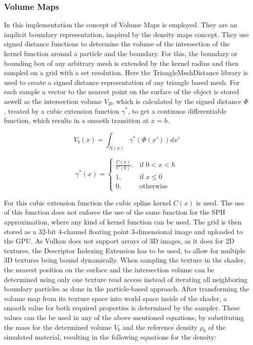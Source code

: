 \documentclass[intern]{cgMA}
\begin{document}
    \subsubsection*{Volume Maps}
    In this implementation the concept of Volume Maps is employed. They are an implicit boundary representation, inspired by the density maps concept. They use signed distance functions to determine the volume of the intersection of the kernel function around a particle and the boundary. For this, the boundary or bounding box of any arbitrary mesh is extended by the kernel radius and then sampled on a grid with a set resolution. Here the TriangleMeshDistance library \cite{trianglemeshdistance} is used to create a signed distance representation of any triangle based mesh. For each sample a vector to the nearest point on the surface of the object is stored aswell as the intersection volume $V_B$, which is calculated by the signed distance $\Phi$, treated by a cubic extension function $\gamma^*$, to get a continuos differentiable function, which results in a smooth transition at $x = h$. \cite{10.1145/3359566.3360077}

    \begin{equation}
        V_b(x) = \int_{N(x)}\gamma^*(\Phi(x'))dx'
    \end{equation}

    \begin{equation}
        \gamma^*(x) = 
        \begin{cases}
            \frac{C(x)}{C(0)},& \text{if } 0 < x < h \\
            1,& \text{if } x \leq 0 \\
            0,              & \text{otherwise}
        \end{cases}
    \end{equation}

    For this cubic extension function the cubic spline kernel $C(x)$ \cite{doi:10.1146/annurev.aa.30.090192.002551} is used. The use of this function does not enforce the use of the same function for the SPH approximation, where any kind of kernel function can be used. \cite{10.1145/3359566.3360077}
    The grid is then stored as a 32-bit 4-channel floating point 3-dimensional image and uploaded to the GPU. As Vulkan does not support arrays of 3D images, as it does for 2D textures, the Descriptor Indexing Extension has to be used, to allow for multiple 3D textures being bound dynamically. When sampling the texture in the shader, the nearest position on the surface and the intersection volume can be determined using only one texture read access instead of iterating all neighboring boundary particles as done in the particle-based approach. After transforming the volume map from its texture space into world space inside of the shader, a smooth value for both required properties is determined by the sampler. These values can the be used in any of the above mentioned equations, by substituting the mass for the determined volume $V_b$ and the reference density $\rho_0$ of the simulated material, resulting in the following equations for the density:
\end{document}
